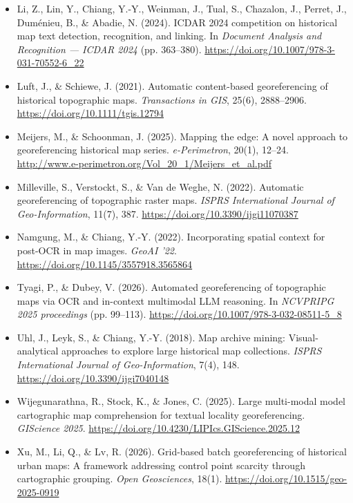 \documentclass[11pt,a4paper]{article}
\begin{document}
\begin{itemize}
\item Li, Z., Lin, Y., Chiang, Y.-Y., Weinman, J., Tual, S., Chazalon, J., Perret, J., Duménieu, B., \& Abadie, N. (2024). ICDAR 2024 competition on historical map text detection, recognition, and linking. In \emph{Document Analysis and Recognition — ICDAR 2024} (pp. 363–380). \url{https://doi.org/10.1007/978-3-031-70552-6_22}
\item Luft, J., \& Schiewe, J. (2021). Automatic content-based georeferencing of historical topographic maps. \emph{Transactions in GIS}, 25(6), 2888–2906. \url{https://doi.org/10.1111/tgis.12794}
\item Meijers, M., \& Schoonman, J. (2025). Mapping the edge: A novel approach to georeferencing historical map series. \emph{e-Perimetron}, 20(1), 12–24. \url{http://www.e-perimetron.org/Vol_20_1/Meijers_et_al.pdf}
\item Milleville, S., Verstockt, S., \& Van de Weghe, N. (2022). Automatic georeferencing of topographic raster maps. \emph{ISPRS International Journal of Geo-Information}, 11(7), 387. \url{https://doi.org/10.3390/ijgi11070387}
\item Namgung, M., \& Chiang, Y.-Y. (2022). Incorporating spatial context for post-OCR in map images. \emph{GeoAI ’22}. \url{https://doi.org/10.1145/3557918.3565864}
\item Tyagi, P., \& Dubey, V. (2026). Automated georeferencing of topographic maps via OCR and in-context multimodal LLM reasoning. In \emph{NCVPRIPG 2025 proceedings} (pp. 99–113). \url{https://doi.org/10.1007/978-3-032-08511-5_8}
\item Uhl, J., Leyk, S., \& Chiang, Y.-Y. (2018). Map archive mining: Visual-analytical approaches to explore large historical map collections. \emph{ISPRS International Journal of Geo-Information}, 7(4), 148. \url{https://doi.org/10.3390/ijgi7040148}
\item Wijegunarathna, R., Stock, K., \& Jones, C. (2025). Large multi-modal model cartographic map comprehension for textual locality georeferencing. \emph{GIScience 2025}. \url{https://doi.org/10.4230/LIPIcs.GIScience.2025.12}
\item Xu, M., Li, Q., \& Lv, R. (2026). Grid-based batch georeferencing of historical urban maps: A framework addressing control point scarcity through cartographic grouping. \emph{Open Geosciences}, 18(1). \url{https://doi.org/10.1515/geo-2025-0919}
\end{itemize}
\end{document}
